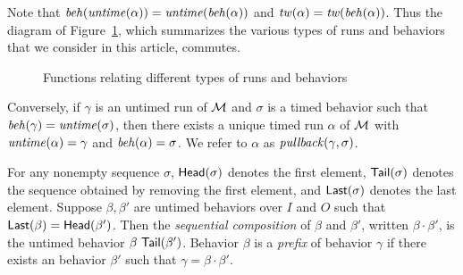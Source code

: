 \fi
Note that $\mathit{beh}(\mathit{untime}(\alpha))=\mathit{untime}(\mathit{beh}(\alpha))$ and $\mathit{tw}(\alpha) = \mathit{tw}(\mathit{beh}(\alpha))$.
\iflong
Thus the diagram of Figure~\ref{fig:diagram}, which summarizes the various types of runs and behaviors that we consider
in this article, commutes.
\begin{figure}[h]
\centering
{}
\caption{Functions relating different types of runs and behaviors}
\label{fig:diagram}
\end{figure}
\fi
Conversely, if $\gamma$ is an untimed run  of ${\mathcal M}$ and $\sigma$ is a timed behavior such that $\mathit{beh}(\gamma) = \mathit{untime}(\sigma)$,
then there exists a unique timed run $\alpha$ of ${\mathcal M}$ with $\mathit{untime}(\alpha) = \gamma$ and $\mathit{beh}(\alpha) = \sigma$.
We refer to $\alpha$ as $\mathit{pullback}(\gamma,\sigma)$.

For any nonempty sequence $\sigma$, $\mathsf{Head}({\sigma})$ denotes the first element, $\mathsf{Tail}({\sigma})$ denotes the sequence obtained by removing the first element, and $\mathsf{Last}({\sigma})$ denotes the last element.
Suppose $\beta, \beta'$ are untimed behaviors over $I$ and $O$ such that $\mathsf{Last}({\beta}) = \mathsf{Head}({\beta'})$.
Then the \emph{sequential composition} of $\beta$ and $\beta'$, written $\beta \cdot \beta'$, is the untimed behavior $\beta ~ \mathsf{Tail}({\beta'})$.
Behavior $\beta$ is a \emph{prefix} of behavior $\gamma$ if there exists an behavior $\beta'$ such that $\gamma = \beta \cdot \beta'$.
